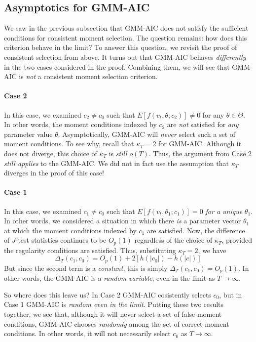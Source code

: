 \subsection{Asymptotics for GMM-AIC}
We saw in the previous subsection that GMM-AIC does not satisfy the sufficient conditions for consistent moment selection. The question remains: how does this criterion behave in the limit? To answer this question, we revisit the proof of consistent selection from above. It turns out that GMM-AIC behaves \emph{differently} in the two cases considered in the proof. Combining them, we will see that GMM-AIC is \emph{not} a consistent moment selection criterion.

\paragraph{Case 2} In this case, we examined $c_2 \neq c_0$ such that $E[f(v_t, \theta; c_2)]\neq 0$ for any $\theta \in \Theta$. In other words, the moment conditions indexed by $c_2$ are \emph{not} satisfied for \emph{any} parameter value $\theta$. Asymptotically, GMM-AIC will \emph{never} select such a set of moment conditions. To see why, recall that $\kappa_T = 2$ for GMM-AIC. Although it does not diverge, this choice of $\kappa_T$ is \emph{still} $o(T)$. Thus, the argument from Case 2 \emph{still applies} to the GMM-AIC. We did not in fact use the assumption that $\kappa_T$ diverges in the proof of this case! 

\paragraph{Case 1} In this case, we examined $c_1\neq c_0$ such that $E[f(v_t, \theta_1;c_1)]=0$ \emph{for a unique} $\theta_1$. In other words, we considered a situation in which there \emph{is} a parameter vector $\theta_1$ at which the moment conditions indexed by $c_1$ are satisfied. Now, the difference of $J$-test statistics continues to be $O_p(1)$ regardless of the choice of $\kappa_T$, provided the regularity conditions are satisfied. Thus, substituting $\kappa_T = 2$, we have
	$$\Delta_T(c_1,c_0) = O_p(1) + 2\left[h(|c_0|) - h(|c|) \right]$$
But since the second term is a \emph{constant}, this is simply $\Delta_T(c_1,c_0) = O_p(1)$. In other words, the GMM-AIC is a \emph{random variable}, even in the limit as $T\rightarrow \infty$.

So where does this leave us? In Case 2 GMM-AIC cosistently selects $c_0$, but in Case 1 GMM-AIC is \emph{random even in the limit}. Putting these two results together, we see that, although it will never select a set of false moment conditions, GMM-AIC chooses \emph{randomly} among the set of correct moment conditions. In other words, it will not necessarily select $c_0$ as $T\rightarrow \infty$. 

